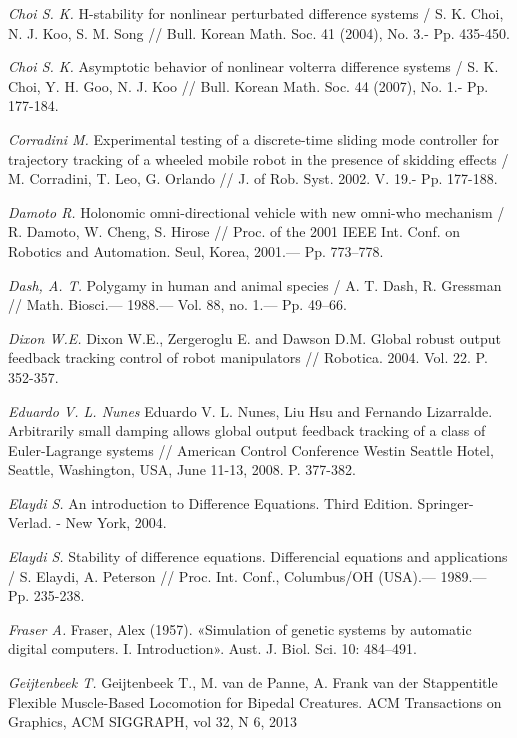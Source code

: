 \begin{thebibliography}{10}
	{\it Choi S. K.} H-stability for nonlinear perturbated difference systems / S. K. Choi, N. J. Koo, S. M. Song // Bull. Korean Math. Soc. 41 (2004), No. 3.- Pp. 435-450.
	
	{\it Choi S. K.} Asymptotic behavior of nonlinear volterra difference systems / S. K. Choi, Y. H. Goo, N. J. Koo // Bull. Korean Math. Soc. 44 (2007), No. 1.- Pp. 177-184.
	
	
	{\it Corradini M.} Experimental testing of a discrete-time sliding mode controller for trajectory tracking of a wheeled mobile robot in the presence of skidding effects / M. Corradini, T. Leo, G. Orlando // J. of Rob. Syst. 2002. V. 19.- Pp. 177-188.
	
	{\it Damoto R.} Holonomic omni-directional vehicle with new omni-who mechanism / R. Damoto, W. Cheng, S. Hirose // Proc. of the 2001 IEEE Int. Conf. on Robotics and Automation. Seul, Korea, 2001.— Pp. 773–778.
	
	
	{\it Dash, A. T.} Polygamy in human and animal species / A. T. Dash, R. Gressman // Math. Biosci.— 1988.— Vol. 88, no. 1.— Pp. 49–66.
	
	{\it Dixon W.E.} Dixon W.E., Zergeroglu E. and Dawson D.M. Global robust output feedback tracking control of robot manipulators // Robotica. 2004. Vol. 22. P. 352-357.
	
	{\it Eduardo V. L. Nunes} Eduardo V. L. Nunes, Liu Hsu and Fernando Lizarralde. Arbitrarily small damping allows global output feedback tracking of a class of Euler-Lagrange systems // American Control Conference Westin Seattle Hotel, Seattle, Washington, USA, June 11-13, 2008. P. 377-382.
	
	{\it Elaydi S.} An introduction to Difference Equations. Third Edition. Springer-Verlad. - New York, 2004.
	
	{\it Elaydi S.} Stability of difference equations. Differencial equations and applications / S. Elaydi, A. Peterson // Proc. Int. Conf., Columbus/OH (USA).— 1989.— Pp. 235-238.
	
	{\it Fraser A.} Fraser, Alex (1957). «Simulation of genetic systems by automatic digital computers. I. Introduction». Aust. J. Biol. Sci. 10: 484–491.
	
	{\it Geijtenbeek T.} Geijtenbeek T., M. van de Panne, A. Frank van der Stappentitle Flexible Muscle-Based Locomotion for Bipedal Creatures. ACM Transactions on Graphics, ACM SIGGRAPH, vol 32, N 6, 2013
	

\end{thebibliography}
